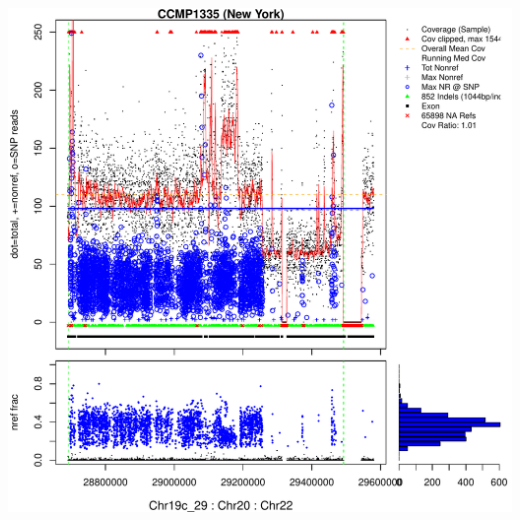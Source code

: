 \documentclass{article}\usepackage[]{graphicx}\usepackage[]{color}
\makeatletter
\def\maxwidth{ %
  \ifdim\Gin@nat@width>\linewidth
    \linewidth
  \else
    \Gin@nat@width
  \fi
}
\newenvironment{knitrout}{}{} %
\makeatother
\begin{document}
\begin{knitrout}
{\centering \includegraphics[width=\maxwidth]{figs-knitr/unnamed-chunk-58-1} 

}



\end{knitrout}
\end{document}
